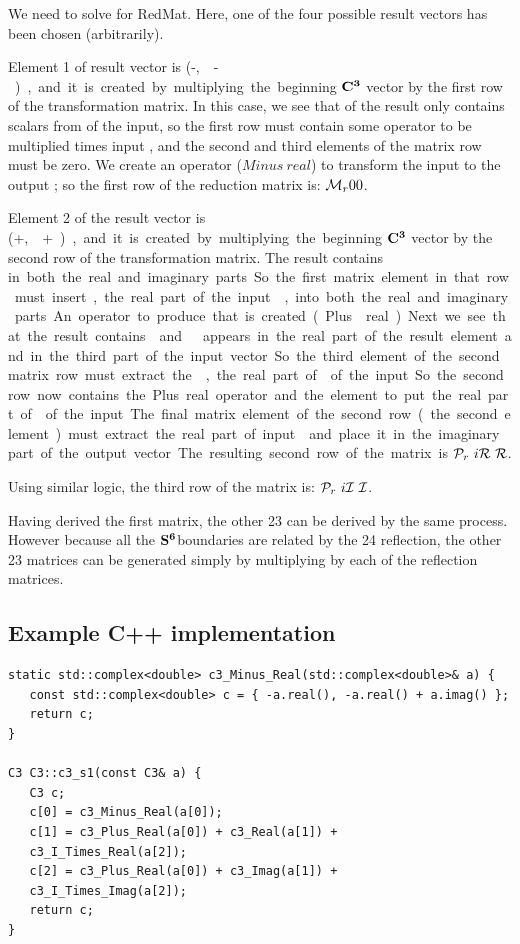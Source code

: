 \documentclass[preprint]{iucr}              %
\numberwithin{equation}{section}
\newcommand{\SVI}[0]{$\bf{S^{6}}$}
\newcommand{\CIII}[0]{$\bf{C^{3}}$}
\newcommand{\Imaginary}[0]{\mathcal{I}}
\newcommand{\Real}[0]{\mathcal{R}}
\begin{document}
We need to solve for RedMat.
Here, one of the four possible result vectors has been chosen 
(arbitrarily). 

Element 1 of result vector is (-\si,~\siv-\si ), and
it is created by multiplying the beginning \CIII{} vector by the
first row of the transformation matrix. In this case, we see
that \ci of the result only contains scalars from \ci of
the input, so the first row must contain some operator to
be multiplied times input \ci, and the second and third
elements of the matrix row must be zero. We create an operator
($Minus~real$) to transform the input \ci to the output \ci; so
the first row of the reduction matrix is: $\mathcal{M}{}_r	 0		 0$. 

Element 2 of the result vector is (\siii+\si,~\sii+\si),
and
it is created by multiplying the beginning \CIII{} vector by the
second row of the transformation matrix. The result \cii
contains \si in both the real and imaginary parts. So
the first matrix element in that row must insert \si, the
real part of the input \ci, into both the real and imaginary
parts. An operator to produce that is created 
(Plus{}~real). Next we see that the result contains \sii and \siii.
\siii appears in the real part of the result element and in the
third part of the input vector. So the third element of the 
second matrix row must extract the \siii, the real part of 
\ciii of the input. So the second row now contains the Plus real
operator and the element to put the  real part of \ciii of the input.
The final matrix element of the second row (the second element)
must extract the real part of input \cii and place it in the
imaginary part of the output vector. The resulting second
row of the matrix is $\Plus_r~i\Real~\Real$.

Using similar logic, the third row of the matrix is:
$\Plus_r~i\Imaginary~\Imaginary$.

Having derived the first matrix, the other 23 can
be derived by the same process. However because all the
\SVI boundaries are related by the 24 reflection, the
other 23 matrices can be generated simply
by multiplying by each of the reflection matrices.

\subsection{Example C++ implementation}

\begin{verbatim}
static std::complex<double> c3_Minus_Real(std::complex<double>& a) {
   const std::complex<double> c = { -a.real(), -a.real() + a.imag() };
   return c;
}
	
C3 C3::c3_s1(const C3& a) {
   C3 c;
   c[0] = c3_Minus_Real(a[0]);
   c[1] = c3_Plus_Real(a[0]) + c3_Real(a[1]) +
   c3_I_Times_Real(a[2]);
   c[2] = c3_Plus_Real(a[0]) + c3_Imag(a[1]) +
   c3_I_Times_Imag(a[2]);
   return c;
}
\end{verbatim}
\end{document}
